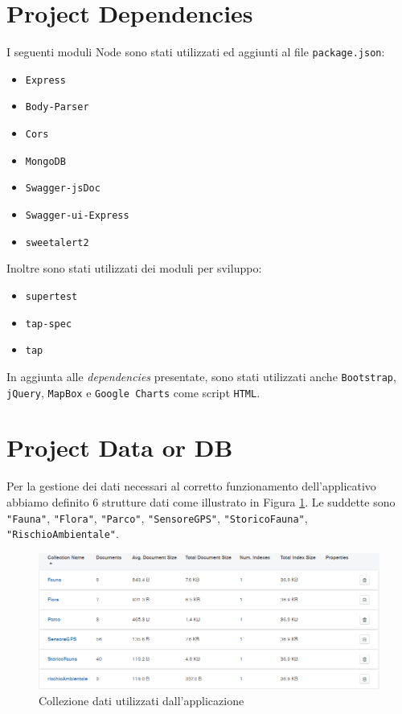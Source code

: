 \section{Project Dependencies}
I seguenti moduli Node sono stati utilizzati ed aggiunti al file \texttt{package.json}:
\begin{itemize}
    \item \texttt{Express}
    \item \texttt{Body-Parser}
    \item \texttt{Cors}
    \item \texttt{MongoDB}
    \item \texttt{Swagger-jsDoc}
    \item \texttt{Swagger-ui-Express}
    \item \texttt{sweetalert2}
\end{itemize}
\newpage
Inoltre sono stati utilizzati dei moduli per sviluppo:
\begin{itemize}
    \item \texttt{supertest}
    \item \texttt{tap-spec}
    \item \texttt{tap}
\end{itemize}

In aggiunta alle \textit{dependencies} presentate, sono stati utilizzati anche \texttt{Bootstrap}, \texttt{jQuery}, \texttt{MapBox} e \texttt{Google Charts} come script \texttt{HTML}.

\section{Project Data or DB}
Per la gestione dei dati necessari al corretto funzionamento dell'applicativo abbiamo definito 6 strutture dati come illustrato in Figura \ref{fig:DB_Structure}. Le suddette sono \texttt{"Fauna"}, \texttt{"Flora"}, \texttt{"Parco"}, \texttt{"SensoreGPS"}, \texttt{"StoricoFauna"}, \texttt{"RischioAmbientale"}.

\begin{figure}[ht]
    \centering
    \includegraphics[scale=0.6]{Img/CollectionsMongoDB.png}
    \caption{Collezione dati utilizzati dall'applicazione}
    \label{fig:DB_Structure}
\end{figure}

